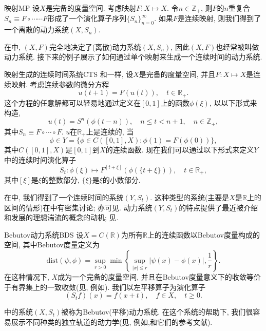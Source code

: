 \begin{example}{映射}{MP}
	设$X$是完备的度量空间. 考虑映射$F:X\mapsto X$. 令$n\in\mathbb{Z}_{+}$, 则$F$的$n$重复合$S_{n}\equiv F\circ\cdots\cdots F$形成了一个演化算子序列$\{S_{n}\}_{n=0}^{\infty}$. 如果$F$是连续映射, 则我们得到了一个离散的动力系统$(X,S_{n})$. 
\end{example}

在中, $(X,F)$完全地决定了(离散)动力系统$(X,S_{n})$, 因此$(X,F)$也经常被叫做动力系统. 接下来的例子展示了如何通过单个映射来生成一个连续时间的动力系统. 

\begin{example}{映射生成的连续时间系统}{CTS}
	和一样, 设$X$是完备的度量空间, 并且$F:X\mapsto X$是连续映射. 考虑连续参数的微分方程$$u(t+1)=F(u(t)),\quad t\in\mathbb{R}_{+}.$$这个方程的任意解都可以轻易地通过定义在$[0,1]$上的函数$\phi(\xi)$, 以以下形式来构造, $$u(t)=S^{n}(\phi(t-n)),\quad n\leqslant t<n+1,\quad n\in\mathbb{Z}_{+},$$其中$S_{n}\equiv F\circ\cdots\circ F$. $u$在$\mathbb{R}_{+}$上是连续的, 当$$\phi\in Y=\{\phi\in C([0,1],X):\phi(1)=F(\phi(0))\},$$其中$C([0,1],X)$是$[0,1]$到$X$的连续函数. 现在我们可以通过以下形式来定义$Y$中的连续时间演化算子$$S_{t}:\phi(\xi)\mapsto F^{[t+\xi]}(\phi(\{t+\xi\})),\quad t\in\mathbb{R}_{+},$$其中$[\xi]$是$\xi$的整数部分, $\{\xi\}$是$\xi$的小数部分. 
\end{example}

在中, 我们得到了一个连续时间的系统$(Y,S_{t})$. 这种类型的系统(主要是$X$是$\mathbb{R}$上的区间的情形)在\cite{Sharkovsky86}中有密集讨论; 亦可见\cite{Sharkovsky89}. 动力系统$(Y,S_{t})$的特点提供了最近被介绍和发展的理想湍流的概念的动机; 见\cite{Sharkovsky06}. 

\begin{example}{Bebutov动力系统}{BDS}
	设$X=C(\mathbb{R})$为所有$\mathbb{R}$上的连续函数以Bebutov度量构成的空间, 其中Bebutov度量定义为$$\mathrm{dist}(\psi,\phi)=\sup_{r>0}\min\left\{\sup_{|x|\leqslant r}|\psi(x)-\phi(x)|,\frac{1}{r}\right\}.$$在这种情况下, $X$成为一个完备的度量空间, 并且在Bebutov度量意义下的收敛等价于有界集上的一致收敛(见, 例如\cite{Sibirsky75}). 我们以左平移算子为演化算子$$(S_{t}f)(x)=f(x+t),\quad f\in X,\quad t\geqslant 0.$$
\end{example}

中的系统$(X,S_{t})$被称为Bebutov(平移)动力系统. 在这个系统的帮助下, 我们很容易展示不同种类的独立轨道的动力学(见, 例如\cite{Nemytskii60},\cite{Sibirsky75}和它们的参考文献). 

